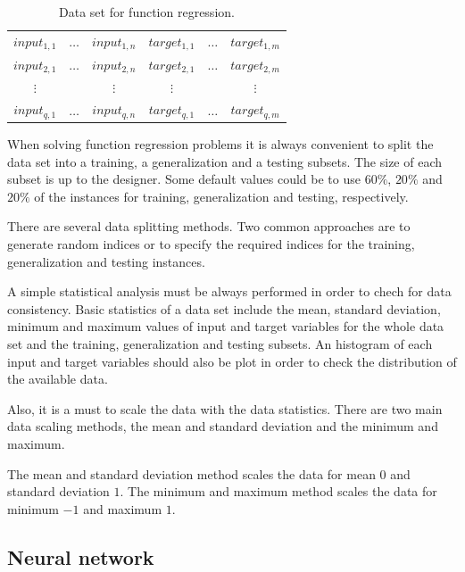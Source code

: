 \begin{table}[h!]
\begin{center}
\begin{tabular}{|ccc|ccc|}
\hline
$input_{1,1}$ & $\ldots$ & $input_{1,n}$ & $target_{1,1}$ & $\ldots$ & $target_{1,m}$\\
$input_{2,1}$ & $\ldots$ & $input_{2,n}$ & $target_{2,1}$ & $\ldots$ & $target_{2,m}$\\
$\vdots$ &  & $\vdots$ & $\vdots$ &  & $\vdots$\\ 
$input_{q,1}$ & $\ldots$ & $input_{q,n}$ & $target_{q,1}$ & $\ldots$ & $target_{q,m}$\\
\hline
\end{tabular}\caption{Data set for function regression.}
\label{DataSetFunctionRegressionTable}
\end{center}
\end{table}

When solving function regression problems it is always convenient to split the data set into a training, a generalization and a testing subsets. The size of each subset is up to the designer. Some default values could be to use $60\%$, $20\%$ and $20\%$ of the instances for training, generalization and testing, respectively. 

There are several data splitting methods. Two common approaches are to generate random indices or to specify the required indices for the training, generalization and testing instances.

A simple statistical analysis must be always performed in order to chech for data consistency. Basic statistics of a data set include the mean, standard deviation, minimum and maximum values of input and target variables for the whole data set and the training, generalization and testing subsets. An histogram of each input and target variables should also be plot in order to check the distribution of the available data. 

Also, it is a must to scale the data with the data statistics. 
There are two main data scaling methods, the mean and standard deviation and the minimum and maximum. 

The mean and standard deviation method scales the data for mean $0$ and standard deviation $1$. 
The minimum and maximum method scales the data for minimum $-1$ and maximum $1$. 

\subsection*{Neural network}

